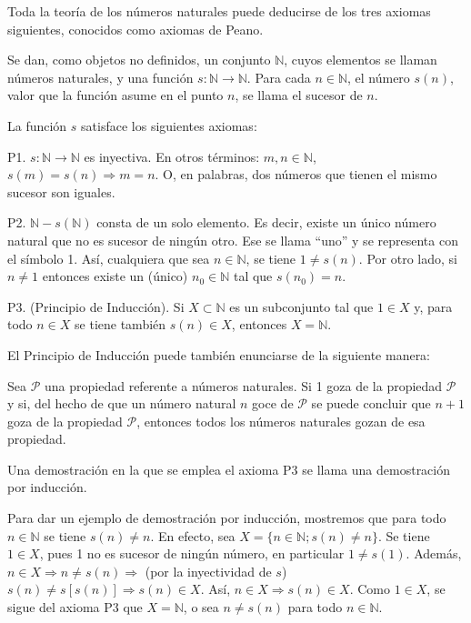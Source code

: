 \documentclass[12pt,oneside]{book}
\begin{document}
Toda la teoría de los números naturales puede deducirse de los tres axiomas siguientes, conocidos como axiomas de Peano.

Se dan, como objetos no definidos, un conjunto \(\mathbb{N}\), cuyos elementos se llaman números naturales, y una función \(s: \mathbb{N} \to \mathbb{N}\). Para cada \(n \in \mathbb{N}\), el número \(s(n)\), valor que la función asume en el punto \(n\), se llama el sucesor de \(n\).

La función \(s\) satisface los siguientes axiomas:

P1. \(s: \mathbb{N} \to \mathbb{N}\) es inyectiva. En otros términos: \(m, n \in \mathbb{N}\), \(s(m) = s(n) \Rightarrow m = n\). O, en palabras, dos números que tienen el mismo sucesor son iguales.

P2. \(\mathbb{N} - s(\mathbb{N})\) consta de un solo elemento. Es decir, existe un único número natural que no es sucesor de ningún otro. Ese se llama “uno” y se representa con el símbolo 1. Así, cualquiera que sea \(n \in \mathbb{N}\), se tiene \(1 \neq s(n)\). Por otro lado, si \(n \neq 1\) entonces existe un (único) \(n_0 \in \mathbb{N}\) tal que \(s(n_0) = n\).

P3. (Principio de Inducción). Si \(X \subset \mathbb{N}\) es un subconjunto tal que \(1 \in X\) y, para todo \(n \in X\) se tiene también \(s(n) \in X\), entonces \(X = \mathbb{N}\).

El Principio de Inducción puede también enunciarse de la siguiente manera:

Sea \(\mathcal{P}\) una propiedad referente a números naturales. Si 1 goza de la propiedad \(\mathcal{P}\) y si, del hecho de que un número natural \(n\) goce de \(\mathcal{P}\) se puede concluir que \(n + 1\) goza de la propiedad \(\mathcal{P}\), entonces todos los números naturales gozan de esa propiedad.

Una demostración en la que se emplea el axioma P3 se llama una demostración por inducción.

Para dar un ejemplo de demostración por inducción, mostremos que para todo \(n \in \mathbb{N}\) se tiene \(s(n) \neq n\). En efecto, sea \(X = \{n \in \mathbb{N}; s(n) \neq n\}\). Se tiene \(1 \in X\), pues 1 no es sucesor de ningún número, en particular \(1 \neq s(1)\). Además, \(n \in X \Rightarrow n \neq s(n) \Rightarrow\) (por la inyectividad de \(s\)) \(s(n) \neq s[s(n)] \Rightarrow s(n) \in X\). Así, \(n \in X \Rightarrow s(n) \in X\). Como \(1 \in X\), se sigue del axioma P3 que \(X = \mathbb{N}\), o sea \(n \neq s(n)\) para todo \(n \in \mathbb{N}\).
\end{document}
